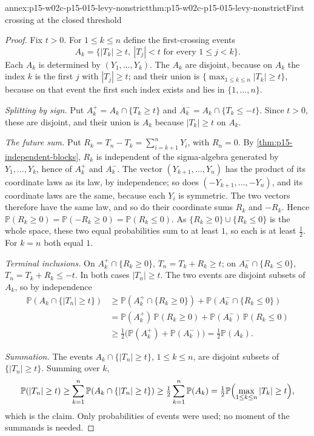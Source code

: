 \begin{annexitem}{annex:p15-w02c-p15-015-levy-nonstrict}{thm:p15-w02c-p15-015-levy-nonstrict}{First crossing at the closed threshold}
\begin{proof}
Fix \(t>0\). For \(1\leq k\leq n\) define the first-crossing events
\[
 A_k=\{|T_k|\geq t,\ |T_j|<t\text{ for every }1\leq j<k\}.
\]
Each \(A_k\) is determined by \((Y_1,\ldots,Y_k)\). The \(A_k\) are
disjoint, because on \(A_k\) the index \(k\) is the first \(j\) with
\(|T_j|\geq t\); and their union is
\(\{\max_{1\leq k\leq n}|T_k|\geq t\}\), because on that event the first
such index exists and lies in \(\{1,\ldots,n\}\).

\emph{Splitting by sign.} Put \(A_k^+=A_k\cap\{T_k\geq t\}\) and
\(A_k^-=A_k\cap\{T_k\leq-t\}\). Since \(t>0\), these are disjoint, and
their union is \(A_k\) because \(|T_k|\geq t\) on \(A_k\).

\emph{The future sum.} Put \(R_k=T_n-T_k=\sum_{i=k+1}^nY_i\), with
\(R_n=0\). By \cref{thm:p15-independent-blocks}, \(R_k\) is independent
of the sigma-algebra generated by \(Y_1,\ldots,Y_k\), hence of
\(A_k^+\) and \(A_k^-\). The vector \((Y_{k+1},\ldots,Y_n)\) has the
product of its coordinate laws as its law, by independence; so does
\((-Y_{k+1},\ldots,-Y_n)\), and its coordinate laws are the same,
because each \(Y_i\) is symmetric. The two vectors therefore have the
same law, and so do their coordinate sums \(R_k\) and \(-R_k\). Hence
\(\mathbb P(R_k\geq0)=\mathbb P(-R_k\geq0)=\mathbb P(R_k\leq0)\). As
\(\{R_k\geq0\}\cup\{R_k\leq0\}\) is the whole space, these two equal
probabilities sum to at least \(1\), so each is at least \(\frac12\).
For \(k=n\) both equal \(1\).

\emph{Terminal inclusions.} On \(A_k^+\cap\{R_k\geq0\}\),
\(T_n=T_k+R_k\geq t\); on \(A_k^-\cap\{R_k\leq0\}\),
\(T_n=T_k+R_k\leq-t\). In both cases \(|T_n|\geq t\). The two events are
disjoint subsets of \(A_k\), so by independence
\[
 \begin{aligned}
 \mathbb P(A_k\cap\{|T_n|\geq t\})
 &\geq\mathbb P(A_k^+\cap\{R_k\geq0\})+\mathbb P(A_k^-\cap\{R_k\leq0\})\\
 &=\mathbb P(A_k^+)\,\mathbb P(R_k\geq0)+\mathbb P(A_k^-)\,\mathbb P(R_k\leq0)\\
 &\geq\tfrac12\bigl(\mathbb P(A_k^+)+\mathbb P(A_k^-)\bigr)
  =\tfrac12\mathbb P(A_k).
 \end{aligned}
\]

\emph{Summation.} The events \(A_k\cap\{|T_n|\geq t\}\), \(1\leq k\leq n\),
are disjoint subsets of \(\{|T_n|\geq t\}\). Summing over \(k\),
\[
 \mathbb P(|T_n|\geq t)\geq\sum_{k=1}^n\mathbb P(A_k\cap\{|T_n|\geq t\})
   \geq\tfrac12\sum_{k=1}^n\mathbb P(A_k)
   =\tfrac12\mathbb P\Bigl(\max_{1\leq k\leq n}|T_k|\geq t\Bigr),
\]
which is the claim. Only probabilities of events were used; no moment
of the summands is needed.


\end{proof}
\end{annexitem}
